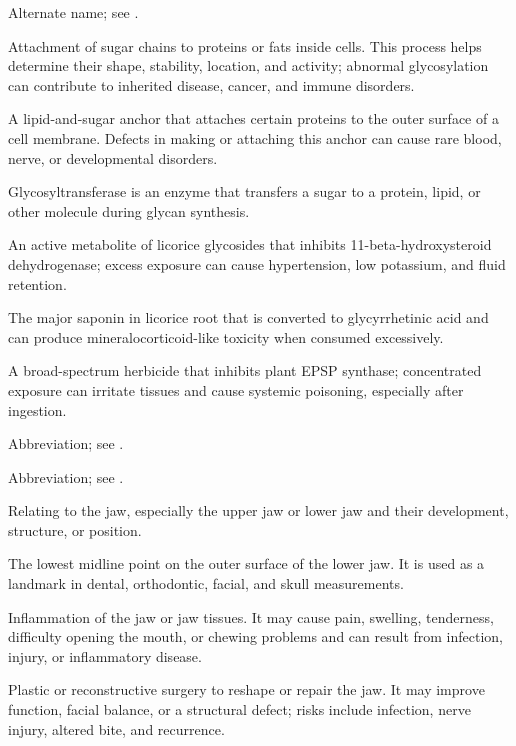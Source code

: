  Alternate name; see .

 Attachment of sugar chains to proteins or fats inside cells. This process helps determine their shape, stability, location, and activity; abnormal glycosylation can contribute to inherited disease, cancer, and immune disorders.

 A lipid-and-sugar anchor that attaches certain proteins to the outer surface of a cell membrane. Defects in making or attaching this anchor can cause rare blood, nerve, or developmental disorders.

 Glycosyltransferase is an enzyme that transfers a sugar to a protein, lipid, or other molecule during glycan synthesis.

 An active metabolite of licorice glycosides that inhibits 11-beta-hydroxysteroid dehydrogenase; excess exposure can cause hypertension, low potassium, and fluid retention.

 The major saponin in licorice root that is converted to glycyrrhetinic acid and can produce mineralocorticoid-like toxicity when consumed excessively.

 A broad-spectrum herbicide that inhibits plant EPSP synthase; concentrated exposure can irritate tissues and cause systemic poisoning, especially after ingestion.

 Abbreviation; see .

 Abbreviation; see .

 Relating to the jaw, especially the upper jaw or lower jaw and their development, structure, or position.

 The lowest midline point on the outer surface of the lower jaw. It is used as a landmark in dental, orthodontic, facial, and skull measurements.

 Inflammation of the jaw or jaw tissues. It may cause pain, swelling, tenderness, difficulty opening the mouth, or chewing problems and can result from infection, injury, or inflammatory disease.

 Plastic or reconstructive surgery to reshape or repair the jaw. It may improve function, facial balance, or a structural defect; risks include infection, nerve injury, altered bite, and recurrence.

